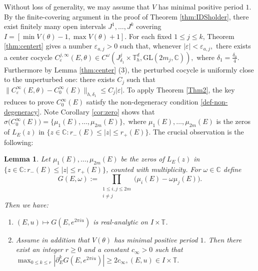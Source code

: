 \documentclass[reqno,11pt]{amsart}
\newtheorem{lemma}{Lemma}[section]
\def\GL{{\mathrm{GL}}}
\begin{document}
Without loss of generality, we may assume that $V$ has minimal positive period $1$.
By the finite-covering argument in the proof of Theorem \ref{thm:IDSholder}, there exist finitely many open intervals $J^1,\dots,J^k$ covering $I=[\min V(\theta)-1,\max V(\theta)+1]$.
For each fixed $1\leq j\leq k$, Theorem \ref{thm:centert} gives a number
$\varepsilon_{a,j}>0$ such that, whenever
$
|\varepsilon|<\varepsilon_{a,j},
$ there exists a center cocycle
$
C_{\varepsilon}^{j,\infty}(E,\theta)
\in C^\omega(J^j_{\delta_1}\times\mathbb T_h^d,\GL(2m_j,\mathbb C)),
$ where $\delta_1=\frac{\delta_0}{4}.$ Furthermore by Lemma \ref{thm:center} (3), the
perturbed cocycle is uniformly close to the unperturbed one: there exists $C_j$ such that
$
\|C_\varepsilon^\infty(E,\theta)-C_0^\infty(E)\|_{h,\delta_1}
\le C_j|\varepsilon|.
$
To apply Theorem \ref{Thm2}, the key reduces to prove $C_0^\infty(E)$ satisfy the non-degeneracy condition \eqref{def-non-degeneracy}. Note  Corollary \ref{cor:zero} shows that $
\sigma\bigl(C_{0}^{\infty}(E)\bigr)
=\{\mu_{1}(E),\dots,\mu_{2m}(E)\},
$
where $
\mu_{1}(E),\dots,\mu_{2m}(E)
$ is the zeros of $L_{E}(z)$ in $\{z\in\mathbb C: r_-(E) \le |z| \le r_+(E)\}$. 
The crucial observation is the  following: 
\begin{lemma}\label{lem:G-analytic}
Let $\mu_1(E),\dots,\mu_{2m}(E)$
be the zeros of $L_{E}(z)$ in $\{z\in\mathbb C: r_-(E) \le |z| \le r_+(E)\}$, counted with multiplicity. For $\omega\in\mathbb C$ define
$$
G(E,\omega):=\prod_{\substack{1\le i,j\le 2m\\ i\neq j}}\bigl(\mu_i(E)-\omega \mu_j(E)\bigr).
$$
Then we have:
\begin{enumerate}
\item $(E,u)\longmapsto G(E,e^{2\pi i u})$ is real-analytic on $I\times\mathbb T$.
\item Assume in addition that $V(\theta)$ has minimal positive period $1$. Then there exist an integer $r\ge 0$ and a constant $c_\infty>0$ such that
$
\max_{0\le k\le r}\left|\partial_E^k G(E,e^{2\pi i u})\right|
\ge 2c_\infty, (E,u)\in I\times\mathbb T.
$
\end{enumerate}
\end{lemma}
\end{document}
